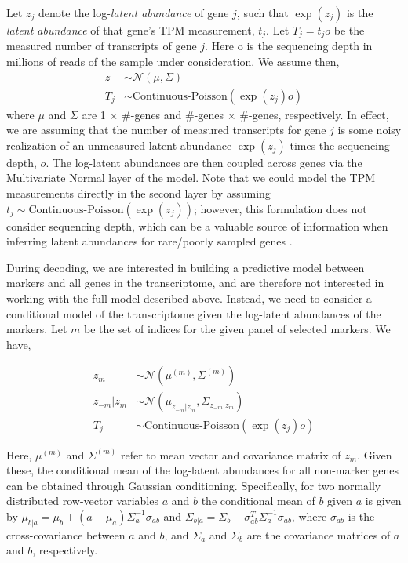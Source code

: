 \documentclass[10pt]{article}
\begin{document}
Let $z_j$ denote the log-\emph{latent abundance} of gene $j$, such that $\exp(z_j)$ is the \emph{latent abundance} of that gene's TPM measurement, $t_j$. Let $T_j = t_jo$ be the measured number of transcripts of gene $j$. Here o is the sequencing depth in millions of reads of the sample under consideration. We assume then, 
\begin{align*}
z & \sim \mathcal{N}\left(\mu, \Sigma\right) \\
T_j & \sim \textrm{Continuous-Poisson}(\exp(z_j)o)
\end{align*}
where $\mu$ and $\Sigma$ are 1 $\times$ $\#$-genes and $\#$-genes $\times$ $\#$-genes, respectively. In effect, we are assuming that the number of measured transcripts for gene $j$ is some noisy realization of an unmeasured latent abundance $\exp(z_j)$ times the sequencing depth, $o$. The log-latent abundances are then coupled across genes via the Multivariate Normal layer of the model. Note that we could model the TPM measurements directly in the second layer by assuming $t_j \sim \textrm{Continuous-Poisson}(\exp(z_j))$; however, this formulation does not consider sequencing depth, which can be a valuable source of information when inferring latent abundances for rare/poorly sampled genes \cite{Biswas2016a}. 

During decoding, we are interested in building a predictive model between markers and all genes in the transcriptome, and are therefore not interested in working with the full model described above. Instead, we need to consider a conditional model of the transcriptome given the log-latent abundances of the markers. Let $m$ be the set of indices for the given panel of selected markers. We have, 

\begin{align*}
z_m & \sim \mathcal{N}(\mu^{(m)}, \Sigma^{(m)}) \\
z_{-m}|z_m & \sim \mathcal{N}(\mu_{z_{-m}|z_m}, \Sigma_{z_{-m}|z_m}) \\
T_j & \sim \textrm{Continuous-Poisson}(\exp(z_j)o)
\end{align*}

Here, $\mu^{(m)}$ and $\Sigma^{(m)}$ refer to mean vector and covariance matrix of $z_m$. Given these, the conditional mean of the log-latent abundances for all non-marker genes can be obtained through Gaussian conditioning. Specifically, for two normally distributed row-vector variables $a$ and $b$ the conditional mean of $b$ given $a$ is given by $\mu_{b|a} = \mu_b + (a - \mu_a)\Sigma_{a}^{-1}\sigma_{ab}$ and $\Sigma_{b|a} = \Sigma_{b} - \sigma_{ab}^T\Sigma_a^{-1}\sigma_{ab}$, where $\sigma_{ab}$ is the cross-covariance between $a$ and $b$, and $\Sigma_a$ and $\Sigma_b$ are the covariance matrices of $a$ and $b$, respectively.
\end{document}
